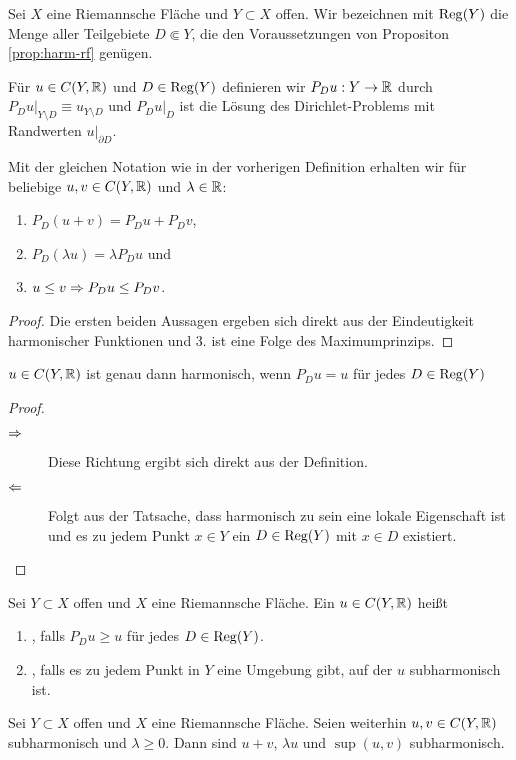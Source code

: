 \begin{defin}
  Sei $X$ eine Riemannsche Fläche und $Y \subset X$ offen. Wir
  bezeichnen mit $\operatorname{Reg}(Y)$ die Menge aller Teilgebiete $D \Subset
  Y$, die den Voraussetzungen von Propositon \ref{prop:harm-rf}
  genügen.
  
  Für $u \in C(Y, \mathbb{R})$ und $D \in \operatorname{Reg}(Y)$ definieren wir $P_D u: Y
  \rightarrow \mathbb{R}$ durch $P_D u |_{Y \setminus D} \equiv u_{Y \setminus D}$ und
  $P_Du|_D$ ist die Lösung des Dirichlet-Problems mit Randwerten
  $u|_{\partial D}$.
\end{defin}

\begin{cor}
  \label{cor:pd-rechenregeln}
  Mit der gleichen Notation wie in der vorherigen Definition erhalten wir
  für beliebige $u, v\in C(Y, \mathbb{R})$ und $\lambda \in \mathbb{R}$:
  \begin{enumerate}
  \item $P_D(u+v) = P_Du + P_D v$,
  \item $P_D(\lambda u) = \lambda P_D u$ und
  \item $u \leq v \Rightarrow P_Du \leq P_D v$.
  \end{enumerate}
\end{cor}

\begin{proof}
  Die ersten beiden Aussagen ergeben sich direkt aus der Eindeutigkeit
  harmonischer Funktionen und 3. ist eine Folge des Maximumprinzips.
\end{proof}

\begin{cor}
  $u \in C(Y, \mathbb{R})$ ist genau dann harmonisch, wenn $P_Du = u $ für
  jedes $D \in \operatorname{Reg}(Y)$
\end{cor}

\begin{proof}
  \begin{description}
  \item[$\Rightarrow$] Diese Richtung ergibt sich direkt aus der Definition.
  \item[$\Leftarrow$] Folgt aus der Tatsache, dass harmonisch zu sein eine
    lokale Eigenschaft ist und es zu jedem Punkt $x \in Y$ ein $D \in
    \operatorname{Reg}(Y)$ mit $x \in D$ existiert.
  \end{description}
\end{proof}

\begin{defin}
  Sei $Y \subset X$ offen und $X$ eine Riemannsche Fläche.
  Ein $u \in C(Y, \mathbb{R})$ heißt
  \begin{enumerate}
  \item {}, falls $P_D u \geq u$ für jedes $D \in \operatorname{Reg}(Y)$.
  \item {}, falls es zu jedem Punkt in $Y$
    eine Umgebung gibt, auf der $u$ subharmonisch ist.
  \end{enumerate}
\end{defin}
\begin{cor}
  Sei $Y \subset X$ offen und $X$ eine Riemannsche Fläche. Seien
  weiterhin $u,v \in C(Y, \mathbb{R})$ subharmonisch und $\lambda \geq
  0$. Dann sind $u+v$, $\lambda u$ und $\sup(u,v)$ subharmonisch.
\end{cor}

